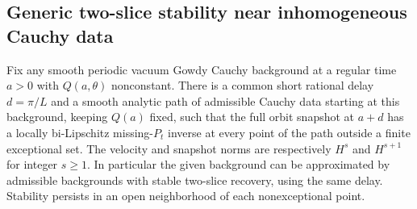 \subsection{Generic two-slice stability near inhomogeneous Cauchy data}
\label{sec:generic-two}

\begin{theorem}
\label{th:generic-two}
Fix any smooth periodic vacuum Gowdy Cauchy background
at a regular time $a>0$ with $Q(a,\theta)$ nonconstant.
There is a common short rational delay $d=\pi/L$ and
a smooth analytic path of admissible Cauchy data starting
at this background, keeping $Q(a)$ fixed, such that
the full orbit snapshot at $a+d$ has a locally
bi-Lipschitz missing-$P_t$ inverse at every point of
the path outside a finite exceptional set.
The velocity and snapshot norms are respectively
$H^s$ and $H^{s+1}$ for integer $s\ge1$.
In particular the given background can be approximated
by admissible backgrounds with stable two-slice
recovery, using the same delay. Stability persists
in an open neighborhood of each nonexceptional point.
\end{theorem}

